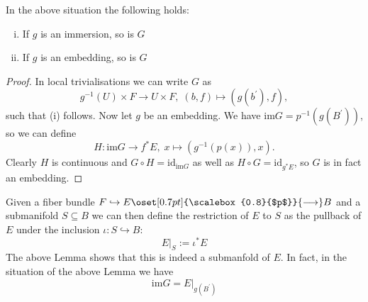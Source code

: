     \begin{lemma}
        \label{lem:pullback_of_bundle_under_embedding}
        In the above situation the following holds:
        \begin{enumerate}[(i)]
            \item If $g$ is an immersion, so is $G$
            \item If $g$ is an embedding, so is $G$
        \end{enumerate}
    \end{lemma}
   \begin{proof}
    In local trivialisations we can write $G$ as
    \[
    g^{-1}(U) \times F \to U \times F, \; (b,f) \mapsto (g(b^\prime),f),
    \]
    such that (i) follows. Now let $g$ be an embedding. We have $\mathrm{im} G = p^{-1}(g(B^\prime))$, so we can define 
    \[
    H \colon \mathrm{im} G \to f^*E, \; x \mapsto (g^{-1}(p(x)),x).
    \]
    Clearly $H$ is continuous and $G \circ H = \mathrm{id}_{\mathrm{im} G}$ as well as $H \circ G = \mathrm{id}_{g^*E}$, so $G$ is in fact an embedding.
   \end{proof}

   Given a fiber bundle $F \hookrightarrow E \oset[0.7pt]{\scalebox{0.8}{$p$}}{\longrightarrow} B$ and a submanifold $S \subseteq B$ we can then define the restriction of $E$ to $S$ as the pullback of $E$ under the inclusion $\iota \colon S \hookrightarrow B$:
   \[
   E|_S := \iota^*E
   \]
   The above Lemma shows that this is indeed a submanfold of $E$. In fact, in the situation of the above Lemma we have $$\mathrm{im} G = E|_{g(B^\prime)}$$
    
     

